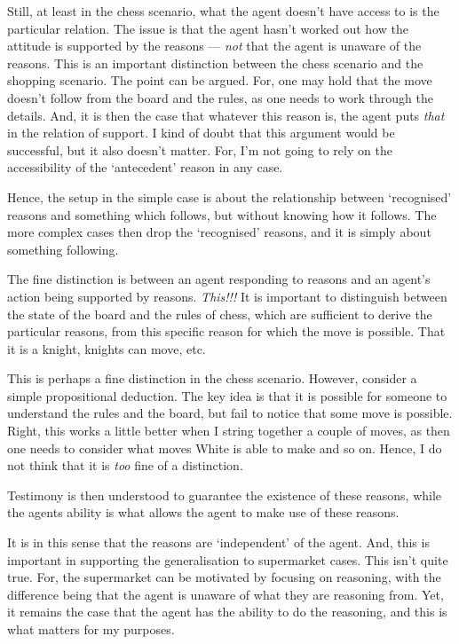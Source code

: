 \documentclass[10pt]{article}
\begin{document}
\begin{note}
  Still, at least in the chess scenario, what the agent doesn't have access to is the particular relation.
  The issue is that the agent hasn't worked out how the attitude is supported by the reasons --- \emph{not} that the agent is unaware of the reasons.
  This is an important distinction between the chess scenario and the shopping scenario.
  The point can be argued.
  For, one may hold that the move doesn't follow from the board and the rules, as one needs to work through the details.
  And, it is then the case that whatever this reason is, the agent puts \emph{that} in the relation of support.
  I kind of doubt that this argument would be successful, but it also doesn't matter.
  For, I'm not going to rely on the accessibility of the `antecedent' reason in any case.

  Hence, the setup in the simple case is about the relationship between `recognised' reasons and something which follows, but without knowing how it follows.
  The more complex cases then drop the `recognised' reasons, and it is simply about something following.
\end{note}

\begin{note}
  The fine distinction is between an agent responding to reasons and an agent's action being supported by reasons.
  {
    \color{red} \emph{This!!!}
  }
  It is important to distinguish between the state of the board and the rules of chess, which are sufficient to derive the particular reasons, from this specific reason for which the move is possible.
  That it is a knight, knights can move, etc.

  This is perhaps a fine distinction in the chess scenario.
  However, consider a simple propositional deduction.
  The key idea is that it is possible for someone to understand the rules and the board, but fail to notice that some move is possible.
  Right, this works a little better when I string together a couple of moves, as then one needs to consider what moves White is able to make and so on.
  Hence, I do not think that it is \emph{too} fine of a distinction.

  Testimony is then understood to guarantee the existence of these reasons, while the agents ability is what allows the agent to make use of these reasons.

  It is in this sense that the reasons are `independent' of the agent.
  And, this is important in supporting the generalisation to supermarket cases.
  This isn't quite true.
  For, the supermarket can be motivated by focusing on reasoning, with the difference being that the agent is unaware of what they are reasoning from.
  Yet, it remains the case that the agent has the ability to do the reasoning, and this is what matters for my purposes.
\end{note}
\end{document}
